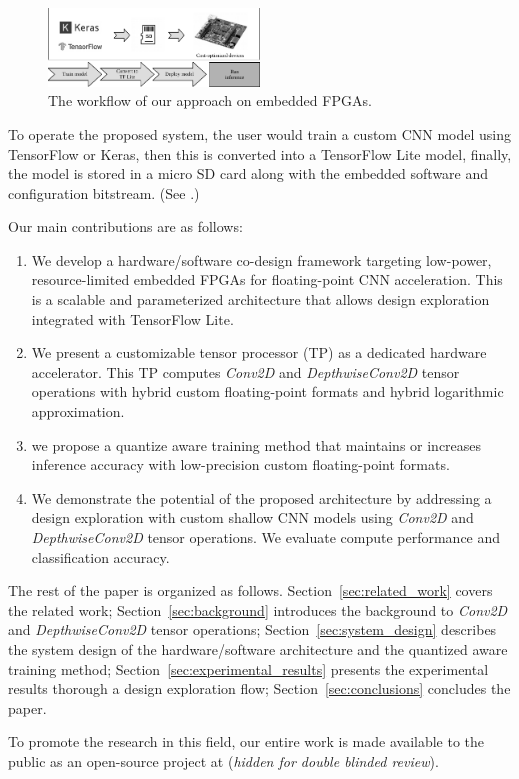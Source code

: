 \begin{figure}[t!]
	\centering
	\includegraphics[width=0.5\textwidth]{../figures/workflow.pdf}
	\caption{The workflow of our approach on embedded FPGAs.}
	\label{fig:workflow}
\end{figure}

To operate the proposed system, the user would train a custom CNN model using TensorFlow or Keras, then this is converted into a TensorFlow Lite model, finally, the model is stored in a micro SD card along with the embedded software and configuration bitstream. (See .)

Our main contributions are as follows:
\begin{enumerate}
	\item We develop a hardware/software co-design framework targeting low-power, resource-limited embedded FPGAs for floating-point CNN acceleration. This is a scalable and parameterized architecture that allows design exploration integrated with TensorFlow Lite.
	\item We present a customizable tensor processor (TP) as a dedicated hardware accelerator. This TP computes \emph{Conv2D} and \emph{DepthwiseConv2D} tensor operations with hybrid custom floating-point formats and hybrid logarithmic approximation.
	\item we propose a quantize aware training method that maintains or increases inference accuracy with low-precision custom floating-point formats.
	\item We demonstrate the potential of the proposed architecture by addressing a design exploration with custom shallow CNN models using \emph{Conv2D} and \emph{DepthwiseConv2D} tensor operations. We evaluate compute performance and classification accuracy.
\end{enumerate}

The rest of the paper is organized as follows. Section~\ref{sec:related_work} covers the related work; Section~\ref{sec:background} introduces the background to \emph{Conv2D} and \emph{DepthwiseConv2D} tensor operations; Section~\ref{sec:system_design} describes the system design of the hardware/software architecture and the quantized aware training method; Section~\ref{sec:experimental_results} presents the experimental results thorough a design exploration flow; Section~\ref{sec:conclusions} concludes the paper.

To promote the research in this field, our entire work is made available to the public as an open-source project at (\emph{hidden for double blinded review}).